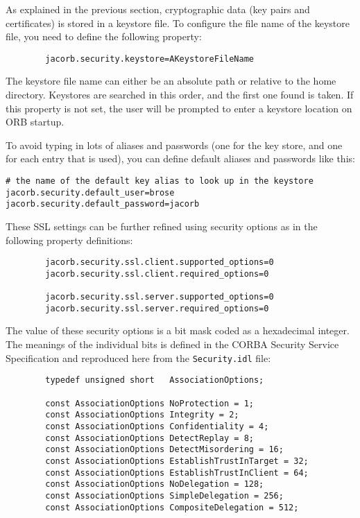 \documentclass[12pt]{scrbook}
\begin{document}
As explained  in the previous  section, cryptographic data  (key pairs
and  certificates) is  stored in  a  keystore  file. To configure the
file name of the keystore file, you need to define the following
property:

\begin{verbatim}
        jacorb.security.keystore=AKeystoreFileName
\end{verbatim}

The keystore file name can either be an absolute path or relative to
the home directory. Keystores are searched in this order, and the
first one found is taken. If this property is not set, the user will be
prompted to enter a keystore location on ORB startup.

To avoid  typing in  lots of  aliases and passwords  (one for  the key
store, and  one for each entry  that is used), you  can define default
aliases and passwords like this:

\begin{verbatim}
# the name of the default key alias to look up in the keystore
jacorb.security.default_user=brose
jacorb.security.default_password=jacorb
\end{verbatim}


These SSL settings can be further refined using security options as in
the following property definitions:

\begin{verbatim}
        jacorb.security.ssl.client.supported_options=0
        jacorb.security.ssl.client.required_options=0

        jacorb.security.ssl.server.supported_options=0
        jacorb.security.ssl.server.required_options=0
\end{verbatim}

The  value  of  these security  options  is  a  bit  mask coded  as  a
hexadecimal integer. The meanings of the individual bits is defined in
the CORBA Security Service  Specification and reproduced here from the
{\tt Security.idl} file:

\begin{verbatim}
        typedef unsigned short   AssociationOptions;

        const AssociationOptions NoProtection = 1;
        const AssociationOptions Integrity = 2; 
        const AssociationOptions Confidentiality = 4; 
        const AssociationOptions DetectReplay = 8; 
        const AssociationOptions DetectMisordering = 16;
        const AssociationOptions EstablishTrustInTarget = 32; 
        const AssociationOptions EstablishTrustInClient = 64;
        const AssociationOptions NoDelegation = 128;
        const AssociationOptions SimpleDelegation = 256; 
        const AssociationOptions CompositeDelegation = 512;
\end{verbatim}
\end{document}
